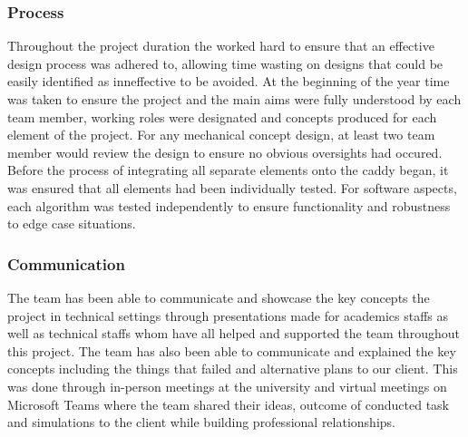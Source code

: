 \documentclass[11pt,landscape]{article}
\begin{document}
\begin{multicols}{3}
\subsubsection{Process}
Throughout the project duration the worked hard to ensure that an effective
design process was adhered to, allowing time wasting on designs that could be
easily identified as inneffective to be avoided. At the beginning of the year
time was taken to ensure the project and the main aims were fully understood by
each team member, working roles were designated and concepts produced for each
element of the project. For any mechanical concept design, at least two team
member would review the design to ensure no obvious oversights had occured.
Before the process of integrating all separate elements onto the caddy began, it
was ensured that all elements had been individually tested. For software
aspects, each algorithm was tested independently to ensure functionality and
robustness to edge case situations. 


\subsubsection{Communication}
The team has been able to communicate and showcase the key concepts the project
in technical settings through presentations made for academics staffs as well as
technical staffs whom have all helped and supported the team throughout this
project. The team has also been able to communicate and explained the key
concepts including the things that failed and alternative plans to our client.
This was done through in-person meetings at the university and virtual meetings
on Microsoft Teams where the team shared their ideas, outcome of conducted task
and simulations to the client while building professional relationships.

\nocite{*}



\end{multicols}
\newpage
\appendix
\end{document}
